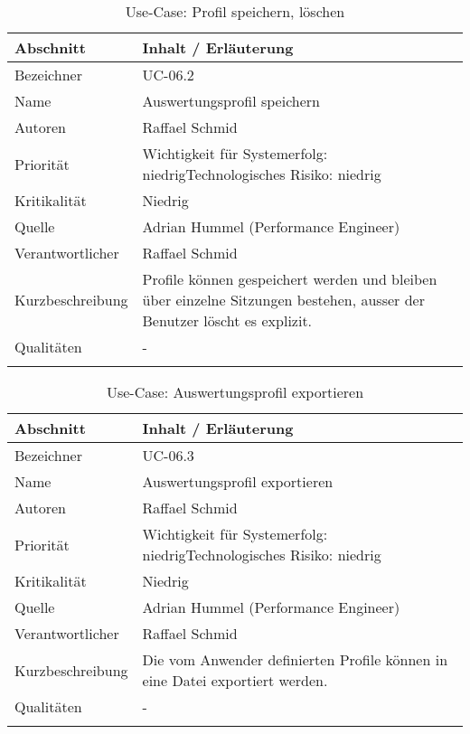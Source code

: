 \begin{longtable}{|p{4cm}|p{10.5cm}|}
\hline
   \textbf{Abschnitt} & \textbf{Inhalt / Erläuterung} \\\hline
   Bezeichner & UC-06.2\\\hline
   Name & Auswertungsprofil speichern\\\hline
   Autoren & Raffael Schmid\\\hline
   Priorität & Wichtigkeit für Systemerfolg: niedrig\newline Technologisches Risiko: niedrig\\\hline
   Kritikalität & Niedrig\\\hline
   Quelle & Adrian Hummel (Performance Engineer)\\\hline
   Verantwortlicher & Raffael Schmid\\\hline
   Kurzbeschreibung & Profile können gespeichert werden und bleiben über einzelne Sitzungen bestehen, ausser der Benutzer löscht es explizit.\\\hline
   Qualitäten & -\\\hline
\caption{Use-Case: Profil speichern, löschen }
\end{longtable}

\begin{longtable}{|p{4cm}|p{10.5cm}|}
\hline
   \textbf{Abschnitt} & \textbf{Inhalt / Erläuterung} \\\hline
   Bezeichner & UC-06.3\\\hline
   Name & Auswertungsprofil exportieren\\\hline
   Autoren & Raffael Schmid\\\hline
   Priorität & Wichtigkeit für Systemerfolg: niedrig\newline Technologisches Risiko: niedrig\\\hline
   Kritikalität & Niedrig\\\hline
   Quelle & Adrian Hummel (Performance Engineer)\\\hline
   Verantwortlicher & Raffael Schmid\\\hline
   Kurzbeschreibung & Die vom Anwender definierten Profile können in eine Datei exportiert werden.\\\hline
   Qualitäten & -\\\hline
\caption{Use-Case: Auswertungsprofil exportieren }
\end{longtable}

